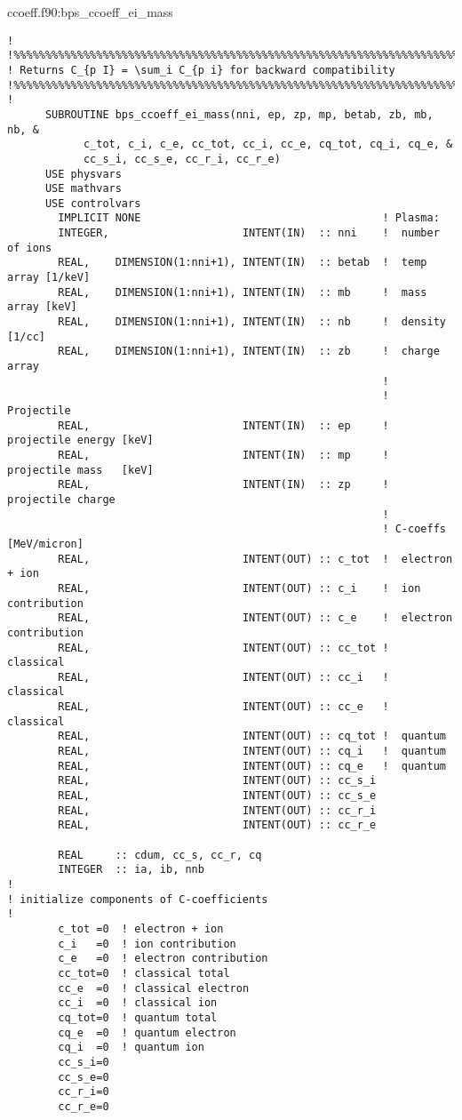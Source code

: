 \documentclass[preprint,12pt,eqsecnum,nofootinbib,amsmath,amssymb]{revtex4}
\begin{document}
{\pagebreak
\vskip0.4cm 
\noindent
ccoeff.f90:bps\_ccoeff\_ei\_mass
{
\baselineskip 10pt
\begin{verbatim}
!
!%%%%%%%%%%%%%%%%%%%%%%%%%%%%%%%%%%%%%%%%%%%%%%%%%%%%%%%%%%%%%%%%%%%%%%%%%%%%
! Returns C_{p I} = \sum_i C_{p i} for backward compatibility
!%%%%%%%%%%%%%%%%%%%%%%%%%%%%%%%%%%%%%%%%%%%%%%%%%%%%%%%%%%%%%%%%%%%%%%%%%%%%
!
      SUBROUTINE bps_ccoeff_ei_mass(nni, ep, zp, mp, betab, zb, mb, nb, &
            c_tot, c_i, c_e, cc_tot, cc_i, cc_e, cq_tot, cq_i, cq_e, &
            cc_s_i, cc_s_e, cc_r_i, cc_r_e)
      USE physvars
      USE mathvars    
      USE controlvars  
        IMPLICIT NONE                                      ! Plasma:
        INTEGER,                     INTENT(IN)  :: nni    !  number of ions
        REAL,    DIMENSION(1:nni+1), INTENT(IN)  :: betab  !  temp array [1/keV]
        REAL,    DIMENSION(1:nni+1), INTENT(IN)  :: mb     !  mass array [keV]
        REAL,    DIMENSION(1:nni+1), INTENT(IN)  :: nb     !  density [1/cc]
        REAL,    DIMENSION(1:nni+1), INTENT(IN)  :: zb     !  charge array
                                                           !
                                                           ! Projectile  
        REAL,                        INTENT(IN)  :: ep     !  projectile energy [keV]
        REAL,                        INTENT(IN)  :: mp     !  projectile mass   [keV]
        REAL,                        INTENT(IN)  :: zp     !  projectile charge
                                                           !
                                                           ! C-coeffs [MeV/micron]
        REAL,                        INTENT(OUT) :: c_tot  !  electron + ion
        REAL,                        INTENT(OUT) :: c_i    !  ion contribution
        REAL,                        INTENT(OUT) :: c_e    !  electron contribution
        REAL,                        INTENT(OUT) :: cc_tot !  classical
        REAL,                        INTENT(OUT) :: cc_i   !  classical
        REAL,                        INTENT(OUT) :: cc_e   !  classical
        REAL,                        INTENT(OUT) :: cq_tot !  quantum
        REAL,                        INTENT(OUT) :: cq_i   !  quantum
        REAL,                        INTENT(OUT) :: cq_e   !  quantum
        REAL,                        INTENT(OUT) :: cc_s_i
        REAL,                        INTENT(OUT) :: cc_s_e 
        REAL,                        INTENT(OUT) :: cc_r_i
        REAL,                        INTENT(OUT) :: cc_r_e

        REAL     :: cdum, cc_s, cc_r, cq
        INTEGER  :: ia, ib, nnb
!
! initialize components of C-coefficients
!
        c_tot =0  ! electron + ion
        c_i   =0  ! ion contribution
        c_e   =0  ! electron contribution
        cc_tot=0  ! classical total
        cc_e  =0  ! classical electron
        cc_i  =0  ! classical ion
        cq_tot=0  ! quantum total
        cq_e  =0  ! quantum electron
        cq_i  =0  ! quantum ion
        cc_s_i=0 
        cc_s_e=0 
        cc_r_i=0
        cc_r_e=0


\end{verbatim}}}
\end{document}
